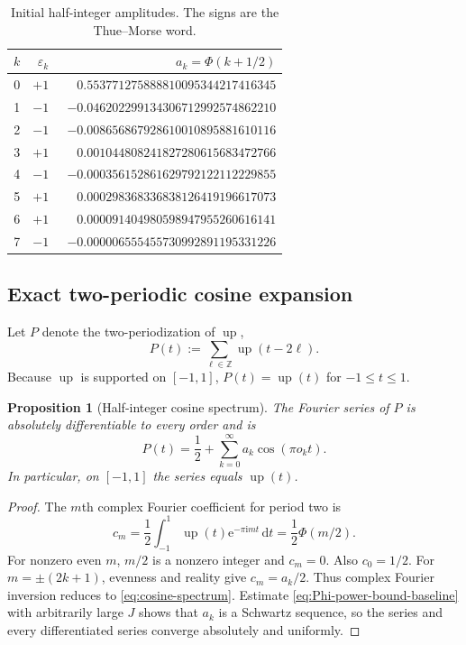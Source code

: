 \documentclass[11pt,oneside]{article}
\newtheorem{proposition}[theorem]{Proposition}
\theoremstyle{definition}
\theoremstyle{remark}
\newcommand{\Z}{\mathbb Z}
\newcommand{\Up}{\operatorname{up}}
\newcommand{\e}{\mathrm e}
\newcommand{\ii}{\mathrm i}
\newcommand{\dd}{\,\mathrm d}
\newcommand{\eps}{\varepsilon}
\newcommand{\PhiU}{\Phi}
\begin{document}
\begin{table}[ht]
\centering\small
\begin{tabular}{@{}r r r@{}}
\toprule
$k$ & $\eps_k$ & $a_k=\PhiU(k+1/2)$ \\
\midrule
0 & $+1$ & $\phantom{-}0.553771275888810095344217416345$ \\
1 & $-1$ & $-0.046202299134306712992574862210$ \\
2 & $-1$ & $-0.008656867928610010895881610116$ \\
3 & $+1$ & $\phantom{-}0.001044808241827280615683472766$ \\
4 & $-1$ & $-0.000356152861629792122112229855$ \\
5 & $+1$ & $\phantom{-}0.000298368336838126419196617073$ \\
6 & $+1$ & $\phantom{-}0.000091404980598947955260616141$ \\
7 & $-1$ & $-0.000006555455730992891195331226$ \\
\bottomrule
\end{tabular}
\caption{Initial half-integer amplitudes.  The signs are the Thue--Morse word.}
\label{tab:first-amplitudes}
\end{table}

\subsection{Exact two-periodic cosine expansion}

Let $P$ denote the two-periodization of $\Up$,
\begin{equation}\label{eq:P-periodization}
 P(t):=\sum_{\ell\in\Z}\Up(t-2\ell).
\end{equation}
Because $\Up$ is supported on $[-1,1]$, $P(t)=\Up(t)$ for $-1\le t\le1$.

\begin{proposition}[Half-integer cosine spectrum]\label{prop:cosine-spectrum}
The Fourier series of $P$ is absolutely differentiable to every order and is
\begin{equation}\label{eq:cosine-spectrum}
 \boxed{
 P(t)=\frac12+\sum_{k=0}^{\infty}a_k\cos(\pi o_k t).}
\end{equation}
In particular, on $[-1,1]$ the series equals $\Up(t)$.
\end{proposition}

\begin{proof}
The $m$th complex Fourier coefficient for period two is
\[
 c_m=\frac12\int_{-1}^{1}\Up(t)\e^{-\pi\ii mt}\dd t
 =\frac12\PhiU(m/2).
\]
For nonzero even $m$, $m/2$ is a nonzero integer and $c_m=0$.  Also
$c_0=1/2$.  For $m=\pm(2k+1)$, evenness and reality give
$c_m=a_k/2$.  Thus complex Fourier inversion reduces to
\eqref{eq:cosine-spectrum}.  Estimate \eqref{eq:Phi-power-bound-baseline} with
arbitrarily large $J$ shows that $a_k$ is a Schwartz sequence, so the series
and every differentiated series converge absolutely and uniformly.
\end{proof}
\end{document}

